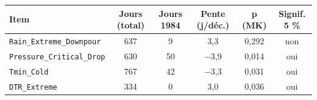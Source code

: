 \footnotesize
\begin{tabular}{lccccc}
\toprule
\rowcolor{NuitBleue!90}
\color{white}\textbf{Item} & \color{white}\textbf{Jours (total)} & \color{white}\textbf{Jours 1984} & \color{white}\textbf{Pente (j/déc.)} & \color{white}\textbf{p (MK)} & \color{white}\textbf{Signif. 5 \%} \\
\midrule
\texttt{Rain\_Extreme\_Downpour} & 637 & 9 & 3,3 & 0,292 & non \\
\texttt{Pressure\_Critical\_Drop} & 630 & 50 & $-$3,9 & 0,014 & oui \\
\texttt{Tmin\_Cold} & 767 & 42 & $-$3,3 & 0,031 & oui \\
\texttt{DTR\_Extreme} & 334 & 0 & 3,0 & 0,036 & oui \\
\bottomrule
\end{tabular}
